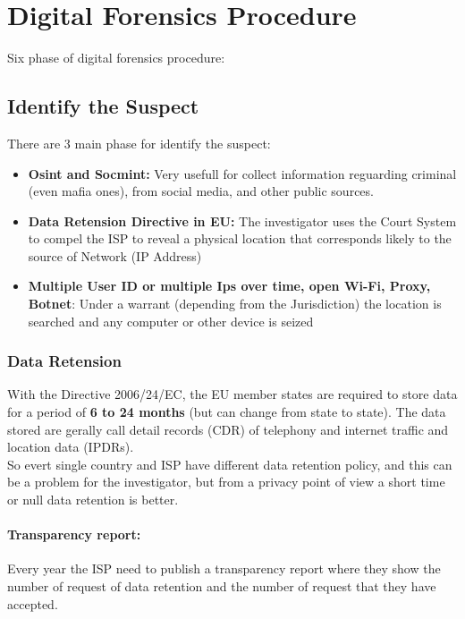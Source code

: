 \section{Digital Forensics Procedure}
Six phase of digital forensics procedure:

\subsection{Identify the Suspect}
There are 3 main phase for identify the suspect:

\begin{itemize}
  \item \textbf{Osint and Socmint:} Very usefull for collect information reguarding criminal
    (even mafia ones), from social media, and other public sources.
  \item \textbf{Data Retension Directive in EU:} The investigator uses the Court
    System to compel the ISP to reveal a physical location that
    corresponds likely to the source of Network (IP Address)
  \item \textbf{Multiple User ID or multiple
    Ips over time,  open Wi-Fi, Proxy, Botnet}: Under a warrant (depending from the Jurisdiction)
    the location is searched and any computer or other device is seized
\end{itemize}

\subsubsection{Data Retension}
With the Directive 2006/24/EC, the EU member states are required to store data for
a period of \textbf{6 to 24 months} (but can change from state to state).
The data stored are gerally call detail records (CDR) of
telephony and internet traffic and location data (IPDRs). \\
So evert single country and ISP have different data retention policy, and
this can be a problem for the investigator, but from a privacy point of view a short time
or null data retention is better.

\newpage

\paragraph{Transparency report:} Every year the ISP need to publish a transparency report
where they show the number of request of data retention and the number of request that they
have accepted.

